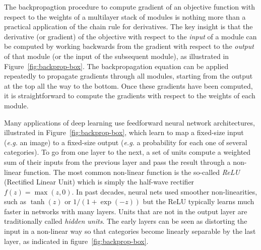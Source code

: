 \documentclass[10pts]{article}
\newcommand{\deri}[2]{\frac{\partial  #1}{\partial #2}}
\begin{document}
The backpropagtion procedure to compute gradient of an objective
function with respect to the weights of a multilayer stack of modules
is nothing more than a practical application of the chain rule for
derivatives. The key insight is that the derivative (or gradient) of
the objective with respect to the {\it input} of a module can be
computed by working backwards from the gradient with respect to the
{\em output} of that module (or the input of the subsequent
module), as illustrated in Figure~\ref{fig:backprop-box}.
The backpropagation equation can be applied repeatedly to propagate
gradients through all modules, starting from the output at the top 
all the way to the bottom. Once these
gradients have been computed, it is straightforward to compute the gradients 
with respect to the weights of each module. 


Many applications of deep learning use feedforward neural network
architectures, illustrated in Figure~\ref{fig:backprop-box}, which
learn to map a fixed-size input ({\it e.g.} an image) to a fixed-size
output ({\it e.g.} a probability for each one of several categories). To go
from one layer to the next, a set of units compute a weighted
sum of their inputs from the previous layer and pass the result
through a non-linear function. The most common non-linear function is
the so-called {\em ReLU} (Rectified Linear Unit) which is simply the
half-wave rectifier $f(z) = \max(z,0)$. In past decades, neural nets
used smoother non-linearities, such as $\tanh(z)$ or $1/(1+\exp(-z))$ but the ReLU 
typically learns much faster in networks with many layers. Units that are not in the
output layer are traditionally called {\em hidden units}. The early
layers can be seen as distorting the input in a non-linear way so that
categories become linearly separable by the last layer, as indicated
in figure~\ref{fig:backprop-box}.
\end{document}
